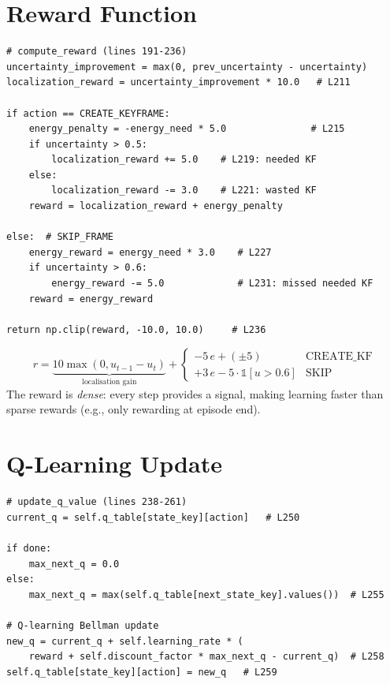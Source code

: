 \documentclass[12pt,a4paper,twoside]{report}
\theoremstyle{definition}
\begin{document}
\section{Reward Function}

\begin{lstlisting}
# compute_reward (lines 191-236)
uncertainty_improvement = max(0, prev_uncertainty - uncertainty)
localization_reward = uncertainty_improvement * 10.0   # L211

if action == CREATE_KEYFRAME:
    energy_penalty = -energy_need * 5.0               # L215
    if uncertainty > 0.5:
        localization_reward += 5.0    # L219: needed KF
    else:
        localization_reward -= 3.0    # L221: wasted KF
    reward = localization_reward + energy_penalty

else:  # SKIP_FRAME
    energy_reward = energy_need * 3.0    # L227
    if uncertainty > 0.6:
        energy_reward -= 5.0             # L231: missed needed KF
    reward = energy_reward

return np.clip(reward, -10.0, 10.0)     # L236
\end{lstlisting}

\begin{mathbox}
\[
  r = \underbrace{10 \max(0, u_{t-1}-u_t)}_{\text{localisation gain}}
    + \begin{cases}
        -5\,e + (\pm 5) & \text{CREATE\_KF} \\
        +3\,e - 5\cdot\mathbb{1}[u>0.6] & \text{SKIP}
      \end{cases}
\]
The reward is \emph{dense}: every step provides a signal, making learning
faster than sparse rewards (e.g., only rewarding at episode end).
\end{mathbox}

\section{Q-Learning Update}

\begin{lstlisting}
# update_q_value (lines 238-261)
current_q = self.q_table[state_key][action]   # L250

if done:
    max_next_q = 0.0
else:
    max_next_q = max(self.q_table[next_state_key].values())  # L255

# Q-learning Bellman update
new_q = current_q + self.learning_rate * (
    reward + self.discount_factor * max_next_q - current_q)  # L258
self.q_table[state_key][action] = new_q   # L259
\end{lstlisting}
\end{document}

